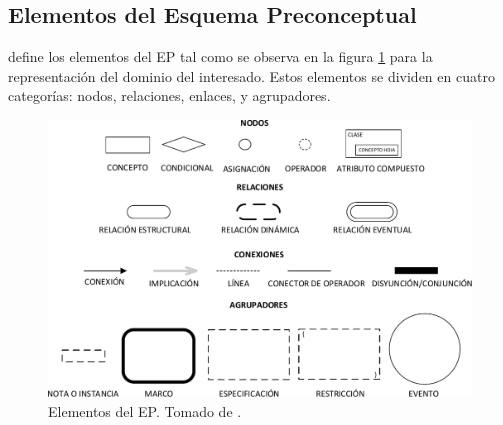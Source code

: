 \subsection{Elementos del Esquema Preconceptual}
\cite{zapata2012unc} define los elementos del EP tal como se observa en la figura \ref{fig:InitialPS} para la representación del dominio del interesado. Estos elementos se dividen en cuatro categorías: nodos, relaciones, enlaces, y agrupadores.\\

\begin{figure}[h]
	\centering%
	\includegraphics[scale=0.51]{Fig/ElementosDelEP.pdf}%
	\caption[Elementos del EP.]{Elementos del EP. Tomado de \citep{zapata2012unc}.} \label{fig:InitialPS}
\end{figure}

